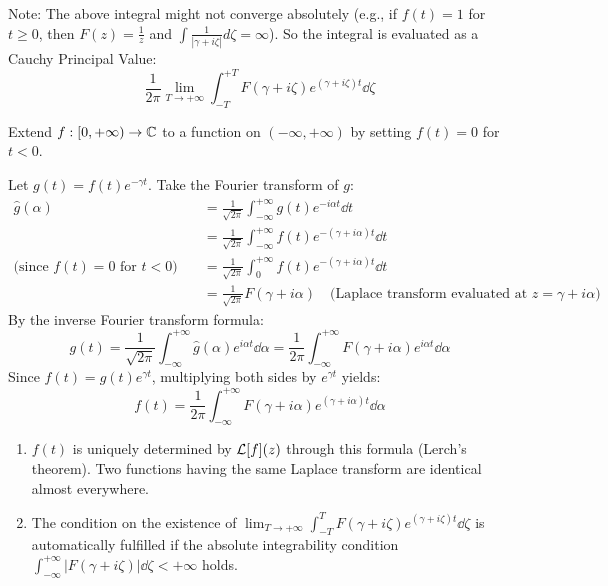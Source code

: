 \begin{verification}
Note: The above integral might not converge absolutely (e.g., if $f(t) = 1$ for $t \ge 0$, then $F(z) = \frac{1}{z}$ and $\int \frac{1}{|\gamma+i\zeta|} d\zeta = \infty$). So the integral is evaluated as a Cauchy Principal Value:
\[
\frac{1}{2\pi} \lim_{T \to +\infty} \int_{-T}^{+T} F(\gamma + i\zeta) e^{(\gamma + i\zeta)t} \dd\zeta
\]
\end{verification}

\begin{proofbox}
Extend $f: [0, +\infty) \to \mathbb{C}$ to a function on $(-\infty, +\infty)$ by setting $f(t) = 0$ for $t < 0$. 

Let $g(t) = f(t) e^{-\gamma t}$. Take the Fourier transform of $g$:
\begin{align*}
\hat{g}(\alpha) &= \frac{1}{\sqrt{2\pi}} \int_{-\infty}^{+\infty} g(t) e^{-i\alpha t} \dd t \\
&= \frac{1}{\sqrt{2\pi}} \int_{-\infty}^{+\infty} f(t) e^{-(\gamma + i\alpha)t} \dd t \\
\text{(since $f(t)=0$ for $t<0$)} \quad &= \frac{1}{\sqrt{2\pi}} \int_{0}^{+\infty} f(t) e^{-(\gamma + i\alpha)t} \dd t \\
&= \frac{1}{\sqrt{2\pi}} F(\gamma + i\alpha) \quad \text{(Laplace transform evaluated at $z = \gamma + i\alpha$)}
\end{align*}
By the inverse Fourier transform formula:
\[
g(t) = \frac{1}{\sqrt{2\pi}} \int_{-\infty}^{+\infty} \hat{g}(\alpha) e^{i\alpha t} \dd\alpha = \frac{1}{2\pi} \int_{-\infty}^{+\infty} F(\gamma + i\alpha) e^{i\alpha t} \dd\alpha
\]
Since $f(t) = g(t) e^{\gamma t}$, multiplying both sides by $e^{\gamma t}$ yields:
\[
f(t) = \frac{1}{2\pi} \int_{-\infty}^{+\infty} F(\gamma + i\alpha) e^{(\gamma + i\alpha)t} \dd\alpha
\]
\end{proofbox}

\begin{remark}
\begin{enumerate}
    \item $f(t)$ is uniquely determined by $\mathcal{L}[f](z)$ through this formula (Lerch's theorem). Two functions having the same Laplace transform are identical almost everywhere.
    \item The condition on the existence of $\lim_{T \to +\infty} \int_{-T}^{T} F(\gamma+i\zeta) e^{(\gamma+i\zeta)t}\dd\zeta$ is automatically fulfilled if the absolute integrability condition $\int_{-\infty}^{+\infty} |F(\gamma+i\zeta)| \dd\zeta < +\infty$ holds.
\end{enumerate}
\end{remark}